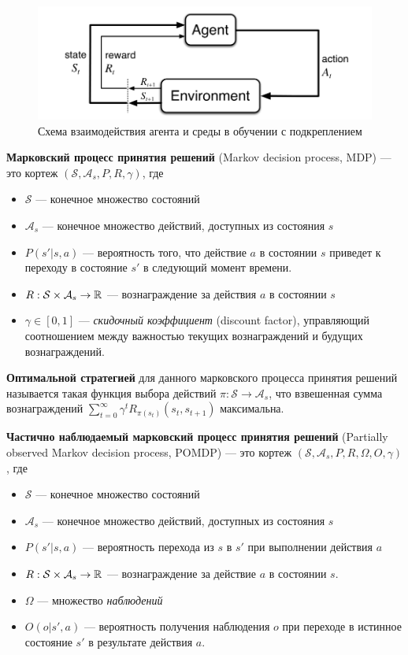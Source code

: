 \documentclass[specification, annotation]{itmo-student-thesis}
\begin{document}
\begin{figure}[!h]
  \caption{Схема взаимодействия агента и среды в обучении с подкреплением}\label{rl-scheme}
  \centering
  \includegraphics[scale=0.5]{rl-scheme}
\end{figure}

\textbf{Марковский процесс принятия решений} (Markov decision process, MDP) \cite{wiki:mdp} ---
это кортеж
$(\mathcal{S}, \mathcal{A}_s, P, R, \gamma)$, где

\begin{itemize}
\item $\mathcal{S}$ --- конечное множество состояний
\item $\mathcal{A}_s$ --- конечное множество действий, доступных из состояния
  $s$
\item $P(s' | s, a)$ --- вероятность того, что действие $a$ в состоянии $s$
  приведет к переходу в состояние $s'$ в следующий момент времени.
\item $R : \mathcal{S} \times \mathcal{A}_s \rightarrow \Bbb{R}$ ---
  вознаграждение за действия $a$ в состоянии $s$
\item $\gamma \in [0, 1]$ --- \textit{скидочный коэффициент} (discount factor),
  управляющий соотношением между важностью текущих вознаграждений и будущих вознаграждений.
\end{itemize}

\textbf{Оптимальной стратегией} для данного марковского процесса принятия
решений называется такая функция выбора действий $\pi : \mathcal{S} \rightarrow \mathcal{A}_s$,
что взвешенная сумма вознаграждений $\sum\limits_{t=0}^{\infty} {\gamma^t
  R_{\pi(s_t)}(s_t, s_{t+1})}$ максимальна.

\textbf{Частично наблюдаемый марковский процесс принятия решений} (Partially
observed Markov decision process, POMDP) \cite{wiki:pomdp} --- это кортеж
$(\mathcal{S}, \mathcal{A}_s, P, R, \Omega, O, \gamma)$, где
\begin{itemize}
\item $\mathcal{S}$ --- конечное множество состояний
\item $\mathcal{A}_s$ --- конечное множество действий, доступных из состояния $s$
\item $P(s' | s, a)$ --- вероятность перехода из $s$ в $s'$ при выполнении
  действия $a$
\item $R : \mathcal{S} \times \mathcal{A}_s \rightarrow \Bbb{R}$ ---
  вознаграждение за действие $a$ в состоянии $s$.
\item $\Omega$ --- множество \textit{наблюдений}
\item $O(o | s', a)$ --- вероятность получения наблюдения $o$ при переходе в
  истинное состояние $s'$ в результате действия $a$. 
\end{itemize}
\end{document}
